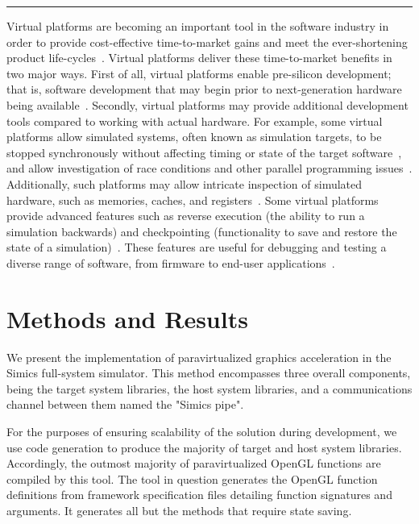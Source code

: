 \documentclass{article}
\newcommand{\masccite}[2][]{\cite{#2}}
\begin{document}
\noindent\rule{8cm}{0.4pt}

Virtual platforms are becoming an important tool in the software industry in order to provide cost-effective time-to-market gains and meet the ever-shortening product life-cycles~\cite{journals:magnusson:2002, journals:yi:2006, publications:leupers:2010, publications:aarno:2014}.
Virtual platforms deliver these time-to-market benefits in two major ways.
First of all, virtual platforms enable pre-silicon development; that is, software development that may begin prior to next-generation hardware being available~\masccite[p.~52]{journals:magnusson:2002, publications:aarno:2014}.
Secondly, virtual platforms may provide additional development tools compared to working with actual hardware.
For example, some virtual platforms allow simulated systems, often known as simulation targets, to be stopped synchronously without affecting timing or state of the target software~\masccite[p.~61]{inproceedings:yu:2012, inproceedings_albertsson:2000}, and allow investigation of race conditions and other parallel programming issues~\masccite[p.~1]{inproceedings:schumacher:2010, publications:leupers:2010, journals:blum:2013}.
Additionally, such platforms may allow intricate inspection of simulated hardware, such as memories, caches, and registers~\masccite[p.~54]{journals:magnusson:2002}.
Some virtual platforms provide advanced features such as reverse execution (the ability to run a simulation backwards) and checkpointing (functionality to save and restore the state of a simulation)~\masccite{publications:aarno:2014, journals:aarno:2013}.
These features are useful for debugging and testing a diverse range of software, from firmware to end-user applications~\masccite[p.~25]{publications:leupers:2010}.

\section{Methods and Results}
\label{sec:methodsandresults}
We present the implementation of paravirtualized graphics acceleration in the Simics full-system simulator.
This method encompasses three overall components, being the target system libraries, the host system libraries, and a communications channel between them named the "Simics pipe".

For the purposes of ensuring scalability of the solution during development, we use code generation to produce the majority of target and host system libraries.
Accordingly, the outmost majority of paravirtualized OpenGL functions are compiled by this tool.
The tool in question generates the OpenGL function definitions from framework specification files detailing function signatures and arguments.
It generates all but the methods that require state saving.
\end{document}
